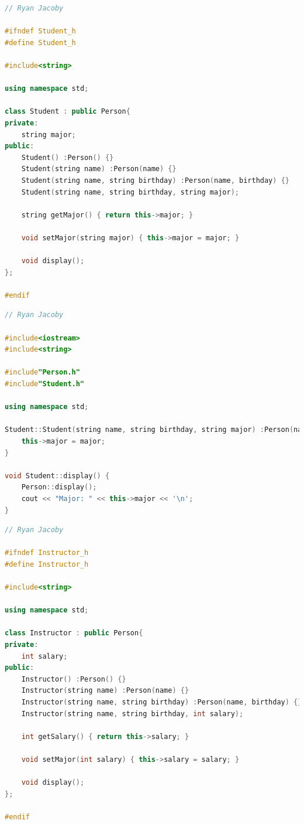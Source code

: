 \documentclass[letterpaper, 11pt]{article}
\begin{document}
\begin{lstlisting}[language=C++, caption=Student.h]
// Ryan Jacoby

#ifndef Student_h
#define Student_h

#include<string>

using namespace std;

class Student : public Person{
private:
    string major;
public:
    Student() :Person() {}
    Student(string name) :Person(name) {}
    Student(string name, string birthday) :Person(name, birthday) {}
    Student(string name, string birthday, string major);

    string getMajor() { return this->major; }

    void setMajor(string major) { this->major = major; }

    void display();
};

#endif
\end{lstlisting}

\begin{lstlisting}[language=C++, caption=StudentImp.cpp]
// Ryan Jacoby

#include<iostream>
#include<string>

#include"Person.h"
#include"Student.h"

using namespace std;

Student::Student(string name, string birthday, string major) :Person(name, birthday) {
    this->major = major;
}

void Student::display() {
    Person::display();
    cout << "Major: " << this->major << '\n';
}
\end{lstlisting}

\begin{lstlisting}[language=C++, caption=Instructor.h]
// Ryan Jacoby

#ifndef Instructor_h
#define Instructor_h

#include<string>

using namespace std;

class Instructor : public Person{
private:
    int salary;
public:
    Instructor() :Person() {}
    Instructor(string name) :Person(name) {}
    Instructor(string name, string birthday) :Person(name, birthday) {}
    Instructor(string name, string birthday, int salary);

    int getSalary() { return this->salary; }

    void setMajor(int salary) { this->salary = salary; }

    void display();
};

#endif
\end{lstlisting}
\end{document}

